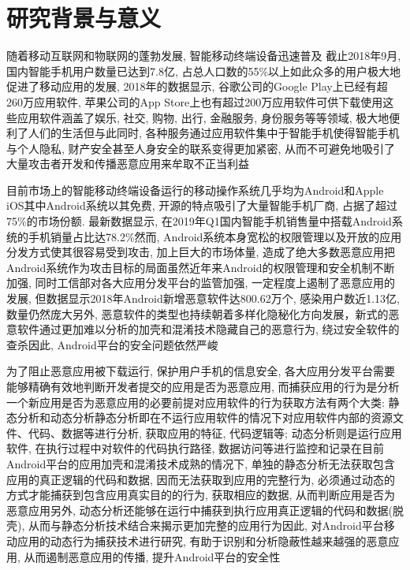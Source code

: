 \section{研究背景与意义}
随着移动互联网和物联网的蓬勃发展, 智能移动终端设备迅速普及\juhao 
截止2018年9月,国内智能手机用户数量已达到7.8亿, 占总人口数的55\%以上\juhao 如此众多的用户极大地促进了移动应用的发展, 2018年的数据显示, 谷歌公司的Google Play上已经有超260万应用软件, 苹果公司的App Store上也有超过200万应用软件可供下载使用\juhao 这些应用软件涵盖了娱乐, 社交, 购物, 出行, 金融服务, 身份服务等等领域, 极大地便利了人们的生活\juhao 但与此同时, 各种服务通过应用软件集中于智能手机使得智能手机与个人隐私, 财产安全甚至人身安全的联系变得更加紧密, 从而不可避免地吸引了大量攻击者开发和传播恶意应用来牟取不正当利益\juhao 

目前市场上的智能移动终端设备运行的移动操作系统几乎均为Android和Apple iOS\juhao 其中Android系统以其免费, 开源的特点吸引了大量智能手机厂商, 占据了超过75\%的市场份额. 最新数据显示, 在2019年Q1国内智能手机销售量中搭载Android系统的手机销量占比达78.2\%\juhao 然而, Android系统本身宽松的权限管理以及开放的应用分发方式使其很容易受到攻击, 加上巨大的市场体量, 造成了绝大多数恶意应用把Android系统作为攻击目标的局面\juhao 虽然近年来Android的权限管理和安全机制不断加强, 同时工信部对各大应用分发平台的监管加强, 一定程度上遏制了恶意应用的发展, 但数据显示2018年Android新增恶意软件达800.62万个, 感染用户数近1.13亿, 数量仍然庞大\juhao 另外, 恶意软件的类型也持续朝着多样化隐秘化方向发展，新式的恶意软件通过更加难以分析的加壳和混淆技术隐藏自己的恶意行为, 绕过安全软件的查杀\juhao 因此, Android平台的安全问题依然严峻\juhao 

为了阻止恶意应用被下载运行, 保护用户手机的信息安全, 各大应用分发平台需要能够精确有效地判断开发者提交的应用是否为恶意应用, 而捕获应用的行为是分析一个新应用是否为恶意应用的必要前提\juhao 对应用软件的行为获取方法有两个大类: 静态分析和动态分析\juhao 静态分析即在不运行应用软件的情况下对应用软件内部的资源文件、代码、数据等进行分析, 获取应用的特征, 代码逻辑等; 动态分析则是运行应用软件, 在执行过程中对软件的代码执行路径, 数据访问等进行监控和记录\juhao 在目前Android平台的应用加壳和混淆技术成熟的情况下, 单独的静态分析无法获取包含应用的真正逻辑的代码和数据, 因而无法获取到应用的完整行为, 必须通过动态的方式才能捕获到包含应用真实目的的行为, 获取相应的数据, 从而判断应用是否为恶意应用\juhao 另外, 动态分析还能够在运行中捕获到执行应用真正逻辑的代码和数据(脱壳), 从而与静态分析技术结合来揭示更加完整的应用行为\juhao 因此, 对Android平台移动应用的动态行为捕获技术进行研究, 有助于识别和分析隐蔽性越来越强的恶意应用, 从而遏制恶意应用的传播, 提升Android平台的安全性\juhao

